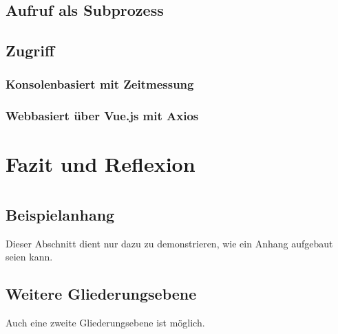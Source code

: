 \documentclass[12pt,oneside,titlepage,listof=totoc,bibliography=totoc]{scrartcl}
\begin{document}
  \subsection{Aufruf als Subprozess}
 \subsection{Zugriff}
  \subsubsection{Konsolenbasiert mit Zeitmessung}
  \subsubsection{Webbasiert über Vue.js mit Axios}

\section{Fazit und Reﬂexion}




\newpage
\section*{\AppendixName} %

\begin{appendices}
\makeatletter
\renewcommand\@seccntformat[1]{\csname the#1\endcsname:\quad}
\makeatother
{} %
	\renewcommand{\thesection}{\AppendixName\ \arabic{section}}
	\renewcommand\thesubsection{\AppendixName\ \arabic{section}.\arabic{subsection}}

	\section{Beispielanhang}\label{Beispielanhang}
	Dieser Abschnitt dient nur dazu zu demonstrieren, wie ein Anhang aufgebaut seien kann.
	\subsection{Weitere Gliederungsebene}
	Auch eine zweite Gliederungsebene ist möglich.

\end{appendices}
\end{document}
